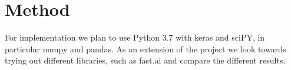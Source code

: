 \section{Method}
For implementation we plan to use Python 3.7 with keras\cite{KERAS} and sciPY\cite{SCIPY}, in particular numpy and pandas.
As an extension of the project we look towards trying out different libraries, such as fast.ai\cite{FASTAI} and compare the different results.
